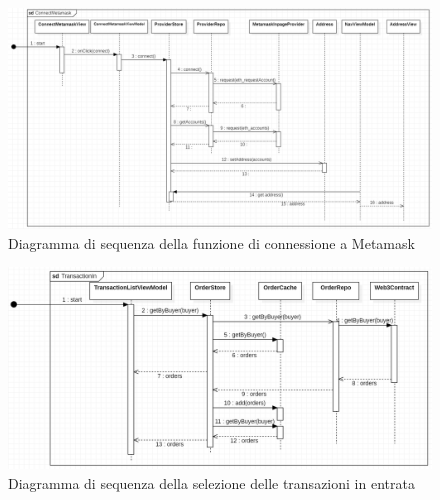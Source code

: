 \begin{landscape}
    \begin{figure}[H]
        \begin{center}
        \includegraphics[scale=0.7]{immagini/connect_metamask.png}
        \caption{Diagramma di sequenza della funzione di connessione a Metamask}
        \end{center}
    \end{figure}
\end{landscape}

\begin{landscape}
    \begin{figure}[H]
        \begin{center}
        \includegraphics[scale=0.7]{immagini/TransactionIn.png}
        \caption{Diagramma di sequenza della selezione delle transazioni in entrata}
        \end{center}
    \end{figure}
\end{landscape}

